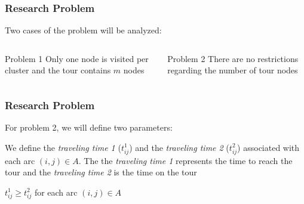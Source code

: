 \documentclass[aspectratio=169]{beamer}
\newcommand{\nologo}{\setbeamertemplate{logo}{}}
\begin{document}
{\nologo
\begin{frame}
\frametitle{Research Problem}
\begin{center}
{\large Two cases of the problem will be analyzed:}
\vspace*{\baselineskip}
\end{center}
\begin{columns}
\begin{block}{Problem 1}
Only one node is visited per cluster and the tour contains $m$ nodes

  \vspace{\baselineskip}
\end{block}

\begin{block}{Problem 2}
There are no restrictions regarding the number of tour nodes

  \vspace{\baselineskip}
\end{block}
\end{columns}
\end{frame}
}

\begin{frame}
\frametitle{Research Problem}
\begin{center}
{\large For problem 2, we will define two parameters:}
\end{center}

\begin{definition}
We define the \textit{traveling time 1} ($t_{ij}^1$) and the \textit{traveling time 2} ($t_{ij}^2$) associated with each arc $(i,j) \in A$. The the \textit{traveling time 1} represents the time to reach the tour and the \textit{traveling time 2} is the time on the tour
\end{definition}
\begin{definition}
$t_{ij}^1 \geq t_{ij}^2$ for each arc $(i,j) \in A$
\end{definition}


\end{frame}
\end{document}
